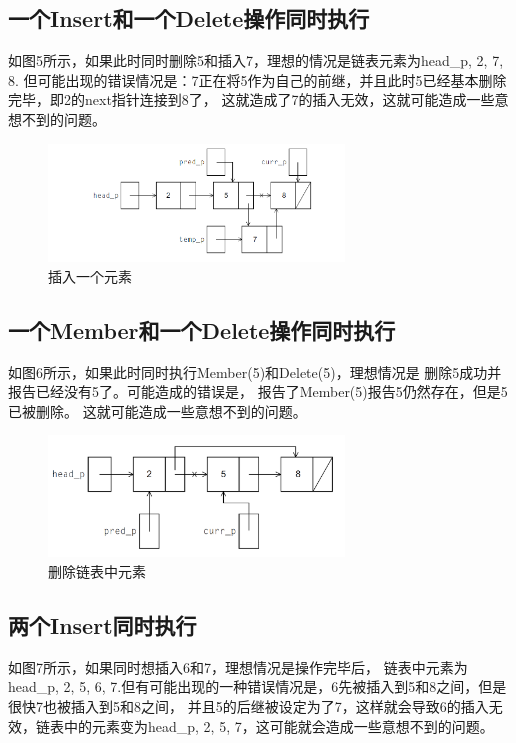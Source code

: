 \documentclass[UTF8]{article}
\begin{document}
\subsection{一个Insert和一个Delete操作同时执行}
如图5所示，如果此时同时删除5和插入7，理想的情况是链表元素为head\_p, 2, 7, 8.
但可能出现的错误情况是：7正在将5作为自己的前继，并且此时5已经基本删除完毕，即2的next指针连接到8了，
这就造成了7的插入无效，这就可能造成一些意想不到的问题。

\begin{figure}[h]
   \centering
       \includegraphics[width=0.7\textwidth]{22.png}
       \caption{插入一个元素}
   \end{figure}
\subsection{一个Member和一个Delete操作同时执行}
如图6所示，如果此时同时执行Member(5)和Delete(5)，理想情况是
删除5成功并报告已经没有5了。可能造成的错误是，
报告了Member(5)报告5仍然存在，但是5已被删除。
这就可能造成一些意想不到的问题。

\begin{figure}[h]
   \centering
       \includegraphics[width=0.7\textwidth]{21.png}
       \caption{删除链表中元素}
   \end{figure}

\subsection{两个Insert同时执行}
如图7所示，如果同时想插入6和7，理想情况是操作完毕后，
链表中元素为head\_p, 2, 5, 6, 7.但有可能出现的一种错误情况是，6先被插入到5和8之间，但是很快7也被插入到5和8之间，
并且5的后继被设定为了7，这样就会导致6的插入无效，链表中的元素变为head\_p, 2, 5, 7，这可能就会造成一些意想不到的问题。
\end{document}
